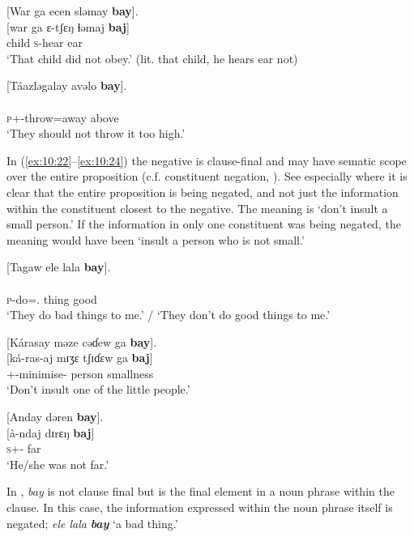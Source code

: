 \ea \label{ex:10:20}
{}[War  ga  ecen  sləmay  \textbf{bay}].\\
\gll  {}[war  ga  ɛ{}-tʃɛŋ  ɬəmaj  \textbf{baj}]\\
      child  {\ADJ}  \textsc{s}-hear  ear  {\NEG}\\
\glt  ‘That child did not obey.’ (lit. that child, he hears ear not)
\z

\ea \label{ex:10:21}
[Táazləgalay  avəlo  \textbf{bay}].\\
\gll  [táá-ɮəg=alaj    avʊlɔ  \textbf{baj}]\\
      \textsc{p}+{\POT}-throw=away    above  {\NEG}\\
\glt  ‘They should not throw it too high.’
\z

In (\ref{ex:10:22}--\ref{ex:10:24}) the negative is clause-final and may have sematic scope over the entire proposition (c.f. constituent negation, ). See especially  where it is clear that the entire proposition is being negated, and not just the information within the constituent closest to the negative. The meaning is ‘don’t insult a small person.’ If the information in only one constituent was being negated, the meaning would have been ‘insult a person who is not small.’

\ea \label{ex:10:22}
[Tagaw  ele  lala  \textbf{bay}].\\
\gll  [ta-g=aw    ɛlɛ   lala  \textbf{baj}]\\
      \textsc{p}-do={\oneS}.{\IO}   thing  good  {\NEG}\\
\glt  ‘They do bad things to me.’ / ‘They don’t do good things to me.’ 
\z

\ea \label{ex:10:23}
{}[Kárasay  məze  cəɗew  ga  \textbf{bay}].\\
\gll  {}[ká-ras-aj     mɪʒɛ   tʃɪɗɛw     ga   \textbf{baj}]\\
      {\twoS}+{\IFV}-minimise{}-{\CL}  person  smallness  {\ADJ}  {\NEG}\\
\glt  ‘Don’t insult one of the little people.’ 
\z

\ea \label{ex:10:24}
{}[Anday  dəren \textbf{bay}].\\
\gll  {}[à-ndaj    dɪrɛŋ  \textbf{baj}]\\
      \textsc{s}+{\PFV}-{\PRG}  far  {\NEG}\\
\glt  ‘He/she was not far.’  
\z

In , \textit{bay} is not clause final but is the final element in a noun phrase within the clause. In this case, the information expressed within the noun phrase itself is negated; \textit{ele lala} \textbf{\textit{bay}} ‘a bad thing.’ 

